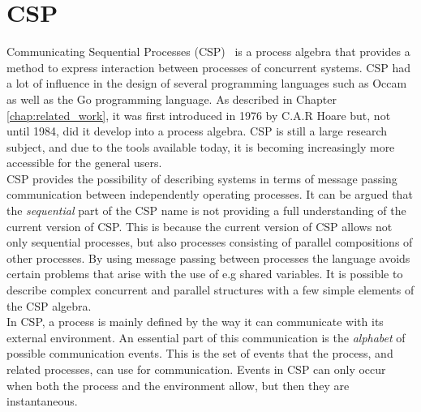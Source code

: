 \section{CSP}
\label{sec:csp_background}
Communicating Sequential Processes (CSP)~\cite{Hoare1978} is a process algebra that provides a method to express interaction between processes of concurrent systems.
CSP had a lot of influence in the design of several programming languages such as Occam as well as the Go programming language. %
As described in Chapter \ref{chap:related_work}, it was first introduced in 1976 by C.A.R Hoare but, not until 1984, did it develop into a process algebra. CSP is still a large research subject, and due to the tools available today, it is becoming increasingly more accessible for the general users.\\

CSP provides the possibility of describing systems in terms of message passing communication between independently operating processes. It can be argued that the \textit{sequential} part of the CSP name is not providing a full understanding of the current version of CSP. This is because the current version of CSP allows not only sequential processes, but also processes consisting of parallel compositions of other processes.
By using message passing between processes the language avoids certain problems that arise with the use of e.g shared variables.
It is possible to describe complex concurrent and parallel structures with a few simple elements of the CSP algebra.\\

In CSP, a process is mainly defined by the way it can communicate with its external environment. An essential part of this communication is the \textit{alphabet} of possible communication events. This is the set of events that the process, and related processes, can use for communication. Events in CSP can only occur when both the process and the environment allow, but then they are instantaneous.\\

